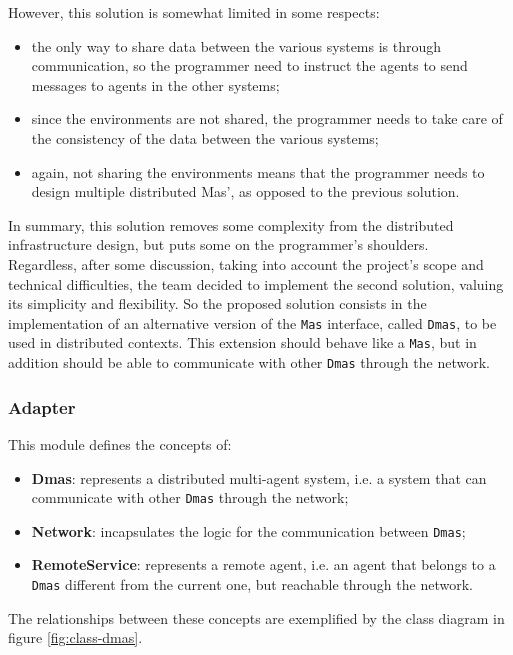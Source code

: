 However, this solution is somewhat limited in some respects:
\begin{itemize}
    \item the only way to share data between the various systems is through communication, so the programmer need to instruct the agents to send messages to agents in the other systems;
    \item since the environments are not shared, the programmer needs to take care of the consistency of the data between the various systems;
    \item again, not sharing the environments means that the programmer needs to design multiple distributed Mas', as opposed to the previous solution.
\end{itemize}

In summary, this solution removes some complexity from the distributed infrastructure design, but puts some on the programmer's shoulders.\\

Regardless, after some discussion, taking into account the project's scope and technical difficulties, the team decided to implement the second solution, valuing its simplicity and flexibility.
So the proposed solution consists in the implementation of an alternative version of the \texttt{Mas} interface, called \texttt{Dmas}, to be used in distributed contexts.
This extension should behave like a \texttt{Mas}, but in addition should be able to communicate with other \texttt{Dmas} through the network.

\subsubsection{Adapter}
This module defines the concepts of:

\begin{itemize}
    \item \textbf{Dmas}: represents a distributed multi-agent system, i.e. a system that can communicate with other \texttt{Dmas} through the network;
    \item \textbf{Network}: incapsulates the logic for the communication between \texttt{Dmas};
    \item \textbf{RemoteService}: represents a remote agent, i.e. an agent that belongs to a \texttt{Dmas} different from the current one, but reachable through the network.
\end{itemize}

The relationships between these concepts are exemplified by the class diagram in figure \ref{fig:class-dmas}.

